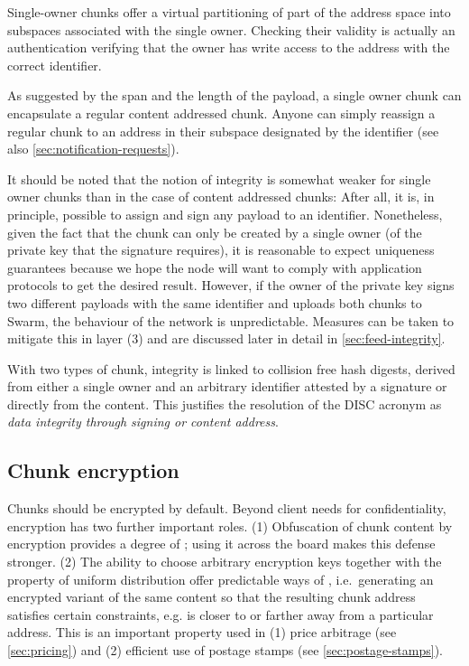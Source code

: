 Single-owner chunks offer a virtual partitioning of part of the address space into subspaces associated with the single owner. Checking their validity is actually an authentication verifying that the owner has write access to the address with the correct identifier.

As suggested by the span and the length of the payload, a single owner chunk can encapsulate a regular content addressed chunk. Anyone can simply reassign a regular chunk to an address in their subspace designated by the identifier (see also \ref{sec:notification-requests}).


It should be noted that the notion of integrity is somewhat weaker for single owner chunks than in the case of content addressed chunks: After all, it is, in principle, possible to assign and sign any payload to an identifier. Nonetheless, given the fact that the chunk can only be created by a single owner (of the private key that the signature requires), it is reasonable to expect uniqueness guarantees because we hope the node will want to comply with application protocols to get the desired result. However, if the owner of the private key signs two different payloads with the same identifier and uploads both chunks to Swarm, the behaviour of the network is unpredictable. Measures can be taken to mitigate this in layer (3) and are discussed later in detail in \ref{sec:feed-integrity}.

With two types of chunk, integrity is linked to collision free hash digests, derived from either a single owner and an arbitrary identifier attested by a signature or directly from the content. This justifies the resolution of the DISC acronym as \emph{data integrity through signing or content address}.

\subsection{Chunk encryption\statusgreen}\label{sec:chunk-encryption}

Chunks should be encrypted by default. Beyond client needs for confidentiality, encryption has two further important roles. (1) Obfuscation of chunk content by encryption provides a degree of ; using it across the board makes this defense stronger. (2) The ability to choose arbitrary encryption keys together with the property of uniform distribution offer predictable ways of , i.e.\ generating an encrypted variant of the same content so that the resulting chunk address satisfies certain constraints, e.g. is closer to or farther away from a particular address. This is an important property used in (1) price arbitrage (see \ref{sec:pricing}) and (2) efficient use of postage stamps (see \ref{sec:postage-stamps}).


